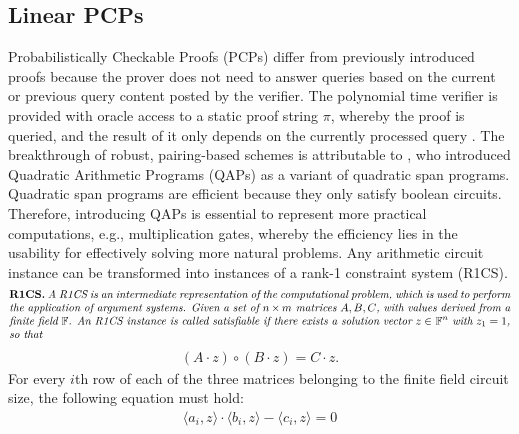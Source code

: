 \subsection{Linear PCPs}
Probabilistically Checkable Proofs (PCPs) differ from previously introduced proofs because the prover does not need to answer queries based on the current or previous query content posted by the verifier. The polynomial time verifier is provided with oracle access to a static proof string \begin{math} \pi \end{math}, whereby the proof is queried, and the result of it only depends on the currently processed query \citep{PCP}. The breakthrough of robust, pairing-based schemes is attributable to \citet{GennaroLinPCP}, who introduced Quadratic Arithmetic Programs (QAPs) as a variant of quadratic span programs. Quadratic span programs are efficient because they only satisfy boolean circuits. Therefore, introducing QAPs is essential to represent more practical computations, e.g., multiplication gates, whereby the efficiency lies in the usability for effectively solving more natural problems. Any arithmetic circuit instance can be transformed into instances of a rank-1 constraint system (R1CS).
\begin{align*}
    \text{\parbox{450pt}{\textbf{R1CS.} \textit{A R1CS is an intermediate representation of the computational problem, which is used to perform the application of argument systems. Given a set of \(n \times m \text{ matrices} \ A, B, C\), with values derived from a finite field \begin{math} \mathbb{F} \end{math}. An R1CS instance is called satisfiable if there exists a solution vector \(z \in\) \begin{math} \mathbb{F}^n \end{math} with \(z_1 = 1\), so that}}}
\end{align*}
\begin{align*}
    (A \cdot z) \circ (B \cdot z) = C \cdot z.
\end{align*}
For every \(i\)th row of each of the three matrices belonging to the finite field circuit size, the following equation must hold:
\begin{align}
    \langle a_i, z \rangle \cdot \langle b_i, z \rangle - \langle c_i, z\rangle = 0 
\end{align}

